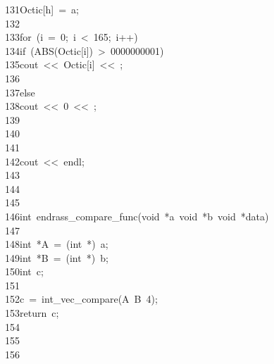 \begin{tabbing}
131\>\>\>Octic[h]\ =\ a;\\[0pt]
132\>\>\\[0pt]
133\>\>for\ (i\ =\ 0;\ i\ <\ 165;\ i++)\ \\[0pt]
134\>\>\>if\ (ABS(Octic[i])\ >\ 0000000001)\ \\[0pt]
135\>\>\>\>cout\ <<\ Octic[i]\ <<\ ;\\[0pt]
136\>\>\>\\[0pt]
137\>\>\>else\ \\[0pt]
138\>\>\>\>cout\ <<\ 0\ <<\ ;\\[0pt]
139\>\\[0pt]
140\>\>\>\\[0pt]
141\>\>\\[0pt]
142\>\>cout\ <<\ endl;\\[0pt]
143\>\\[0pt]
144\>\\[0pt]
145\>\\[0pt]
146\>int\ endrass\_compare\_func(void\ *a\ void\ *b\ void\ *data)\\[0pt]
147\>\\[0pt]
148\>\>int\ *A\ =\ (int\ *)\ a;\\[0pt]
149\>\>int\ *B\ =\ (int\ *)\ b;\\[0pt]
150\>\>int\ c;\\[0pt]
151\>\\[0pt]
152\>\>c\ =\ int\_vec\_compare(A\ B\ 4);\\[0pt]
153\>\>return\ c;\\[0pt]
154\>\\[0pt]
155\>\\[0pt]
156\>\end{tabbing}
